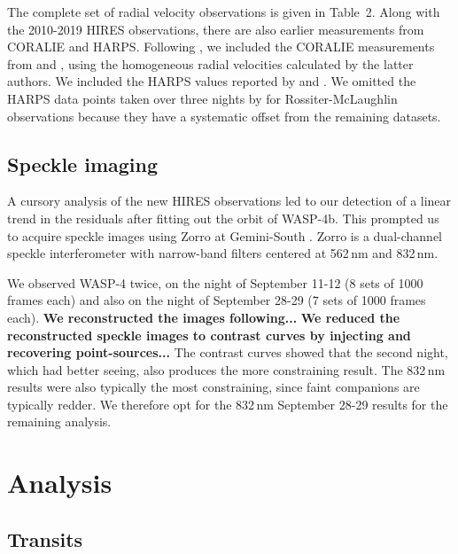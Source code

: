 \documentclass[12pt,twocolumn,tighten]{aastex62}
\begin{document}
The complete set of radial velocity observations is given in 
Table~2.  Along with the 2010-2019 HIRES observations, there are also
earlier measurements from CORALIE and HARPS.  Following
, we included the CORALIE measurements
from \citet{wilson_wasp-4b_2008} and \citet{triaud_spin-orbit_2010},
using the homogeneous radial velocities calculated by the latter
authors. We included the HARPS values reported by
\citet{pont_determining_2011} and \citet{husnoo_observational_2012}.
We omitted the HARPS data points taken over three nights by
\citet{triaud_spin-orbit_2010} for Rossiter-McLaughlin observations
because they have a systematic offset from the remaining datasets.

\subsection{Speckle imaging}

A cursory analysis of the new HIRES observations led to our detection
of a linear trend in the residuals after fitting out the orbit of
WASP-4b.  This prompted us to acquire speckle images using Zorro at
Gemini-South \citep[see][and the instrument
web-pages\footnote{\url{www.gemini.edu/sciops/instruments/alopeke-zorro/}}]{scott_nessi_2018}.
Zorro is a dual-channel speckle interferometer with narrow-band
filters centered at 562$\,$nm and 832$\,$nm.  

We observed WASP-4 twice, on the night of September 11-12 (8 sets of
1000 frames each) and also on the night of September 28-29 (7 sets of
1000 frames each).
{\bf We reconstructed the images following...}
{\bf We reduced the reconstructed speckle images to contrast curves by
injecting and recovering point-sources...}
The contrast curves showed that the second night, which had better
seeing, also produces the more constraining result.
The 832$\,$nm results were also typically the most constraining, since
faint companions are typically redder.
We therefore opt for the 832$\,$nm September 28-29 results for the
remaining analysis.



\section{Analysis}
\label{sec:analysis}

\subsection{Transits}
\label{sec:transit_analysis}
\end{document}
